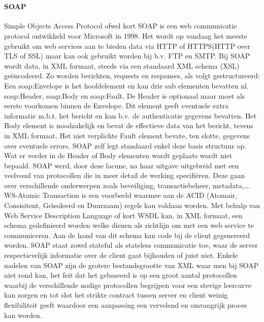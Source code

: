 ~\paragraph{SOAP}
Simple Objects Access Protocol ofwel kort SOAP is een web communicatie protocol ontwikkeld voor Microsoft in 1998. Het wordt op vandaag het meeste gebruikt om
web services aan te bieden data via HTTP of HTTPS(HTTP over TLS of SSL) maar kan ook gebruikt worden bij b.v. FTP en SMTP.
Bij SOAP wordt data, in XML formaat, steeds via een standaard XML schema (XSL) ge\"encodeerd. Zo worden berichten, requests en responses, als volgt gestructureerd:
Een \<soap:Envelope\> is het hoofdelement en kan drie sub elementen bevatten nl. \<soap:Header\>, \<soap:Body\> en \<soap:Fault\>. De Header is optionaal maar moet
als eerste voorkomen binnen de Envelope. Dit element geeft eventuele extra informatie m.b.t. het bericht en kan b.v. de authenticatie gegevens bevatten. Het Body element
is noodzakelijk en bevat de effectieve data van het bericht, tevens in XML formaat. Het niet verplichte Fault element bevate, ten slotte, gegevens over eventuele errors.\newline
SOAP zelf legt standaard enkel deze basis structuur op. Wat er verder in de Header of Body elementen wordt geplaats wordt niet bepaald. SOAP werd, door deze lacune, na haar
uitgave uitgebreid met een veelvoud van protocollen die in meer detail de werking specifi\"eren. Deze gaan over verschillende onderwerpen zoals beveiliging, transactiebeheer,
metadata,\ldots. WS-Atomic Transaction is een voorbeeld waarmee aan de ACID (Atomair, Consisitent, Ge\"{\i}soleerd en Duurzaam) regels kan voldaan worden.
Met behulp van Web Service Description Language of kort WSDL kan, in XML formaat, een schema gedefinieerd worden welke dienen als richtlijn om met een web service te
communiceren. Aan de hand van dit schema kan code bij de client gegenereerd worden. SOAP staat zowel stateful als stateless communicatie toe, waar de server respectievelijk
informatie over de client gaat bijhouden of juist niet.\newline
Enkele nadelen van SOAP zijn de grotere bestandsgrootte van XML waar men bij SOAP niet rond kan, het feit dat het gebaseerd is op een groot aantal protocollen waarbij
de verschillende nodige protocollen begrijpen voor een stevige leercurve kan zorgen en tot slot het strikte contract tussen server en client weinig flexibiliteit geeft
waardoor een aanpassing een vervelend en omvangrijk proces kan worden.\newline
~\autocite{soap}\\
~\autocite{redhatapissoaprestgraphqlgrpc}\\

